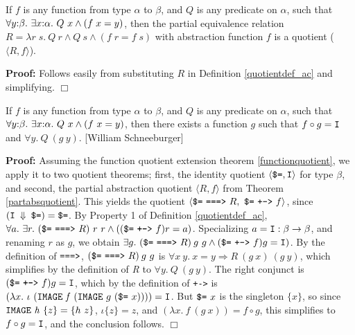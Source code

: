 \documentclass[envcountsame,runningheads]{llncs}
\newcommand{\repofabs}{\Downarrow}
\begin{document}
\begin{theorem}
\label{partabsquotient}
If $f$ is any function from type $\alpha$ to $\beta$,
and
$Q$ is any predicate on $\alpha$,
such that $\forall y{\tt :}\beta.\ \exists x{\tt :}\alpha.\ Q\ x \wedge (f\;x = y)$,
then the partial equivalence relation $R = \lambda r\;s.\ Q\ r \wedge Q\ s \wedge (f\;r = f\;s)$
with abstraction function $f$ is a quotient ($\langle R,f \rangle$).
\end{theorem}
{\bf Proof:}
Follows easily from substituting $R$
in Definition \ref{quotientdef_ac}
and simplifying.
$\Box$

\begin{theorem}
\label{partinverses}
If $f$ is any function from type $\alpha$ to $\beta$, and $Q$ is any
predicate on $\alpha$,
such that $\forall y{\tt :}\beta.\ \exists x{\tt :}\alpha.\ Q\ x \wedge (f\ x = y)$,
then there exists a function $g$ such that
$f \circ g = {\tt I}$
and
$\forall y.\ Q\ (g\ y)$.
{\rm 
[William Schneeburger]}
\end{theorem}
{\bf Proof:}
Assuming the function quotient extension theorem
\ref{functionquotient},
we apply it to two quotient theorems;
first, the identity quotient
$\langle \mbox{\tt \$=}, \mbox{\tt I} \rangle$
for type $\beta$, and second,
the partial abstraction quotient $\langle R,f \rangle$
from Theorem \ref{partabsquotient}.
This yields the quotient
$\langle \mbox{\tt \$=}\ \mbox{\tt ===>}\ R,\ 
 \mbox{\tt \$=}\ \mbox{\tt +->}\ f \rangle$,
since $(\mbox{\tt I $\repofabs$ \$=}) = \mbox{\tt \$=}$.
By Property 1 of Definition \ref{quotientdef_ac},
$\forall a.\ \exists r.\ (\mbox{\tt \$=}\ \mbox{\tt ===>}\ R)\ r\ r \wedge
((
\mbox{\tt \$=}
\ \mbox{\tt +->}\ f) r = a)$.
Specializing $a = {\tt I}:\beta \rightarrow \beta$,
and renaming $r$ as $g$, we obtain
$\exists g.\ (\mbox{\tt \$=}\ \mbox{\tt ===>}\ R)\:g\ g \wedge
(\mbox{\tt \$=}\ \mbox{\tt +->}\ f) g = {\tt I})$.
By the definition of $\mbox{\tt ===>}$,
$(\mbox{\tt \$=}\ \mbox{\tt ===>}\ R)\:g\ g$ is 
$\forall x\ y.\ x = y \Rightarrow R\ (g\ x)\ (g\ y)$,
which simplifies by the definition of {\it R\/} to $\forall y.\ Q\ (g\ y)$.
The right conjunct is
$
(\mbox{\tt \$=}\ \mbox{\tt +->}\ f) g = {\tt I}$,
which by the definition of {\tt +->} is 
$
(\lambda x.\ 
\iota \ ({\tt IMAGE}\ {\it f}\ ({\tt IMAGE}\ g\ (\mbox{\tt \$=}\ x))))
 = {\tt I}$.
But $\mbox{\tt \$=}\ x$ is the singleton $\{x\}$,
so since ${\tt IMAGE}\ {\it h}\ \{z\} = \{h\ z\}$,
$\iota \{z\} = z$,
and $(\lambda x.\ f\ (g\ x)) = f \circ g$,
this
simplifies
to $
f \circ g = {\tt I}$,
and
the conclusion follows.
$\Box$
\end{document}
